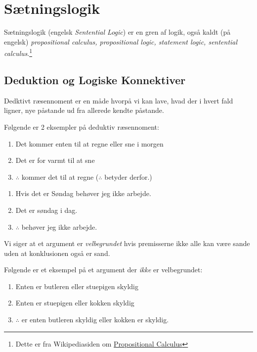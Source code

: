 \chapter{Sætningslogik}

Sætningslogik (engelsk \textit{Sentential Logic}) er en gren af logik, også kaldt (på engelsk) \textit{propositional calculus, propositional logic, statement logic, sentential calculus}.\footnote{Dette er fra Wikipediasiden om \href{https://en.wikipedia.org/wiki/Propositional_calculus}{Propositional Calculus}}

\section{Deduktion og Logiske Konnektiver}%
\label{sec:deduktionoglogiskekonnektiver}

Dedktivt ræsennoment er en måde hvorpå vi kan lave, hvad der i hvert fald ligner, nye påstande ud fra allerede kendte påstande.
\begin{example}
  Følgende er 2 eksempler på deduktiv ræsennoment:
  \begin{enumerate}
    \item Det kommer enten til at regne eller sne i morgen
    \item Det er for varmt til at sne
    \item $\therefore$ kommer det til at regne ($\therefore$ betyder derfor.)
  \end{enumerate}

  \begin{enumerate}
    \item Hvis det er Søndag behøver jeg ikke arbejde.
    \item Det er søndag i dag.
    \item $\therefore$ behøver jeg ikke arbejde.
  \end{enumerate}
\end{example}

Vi siger at et argument er \textit{velbegrundet} hvis premisserne ikke alle kan være sande uden at konklusionen også er sand.
\begin{example}
  \label{eks:ikkevelbegrundet}
Følgende er et eksempel på et argument der \textit{ikke} er velbegrundet:
  \begin{enumerate}
    \item Enten er butleren eller stuepigen skyldig
    \item Enten er stuepigen eller kokken skyldig
    \item $\therefore$ er enten butleren skyldig eller kokken er skyldig.
  \end{enumerate}
\end{example}

